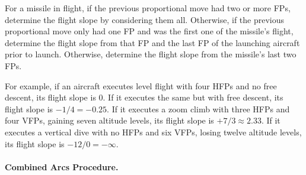 {For a missile in flight, if the previous proportional move had two or more FPs, determine the flight slope by considering them all. Otherwise, if the previous proportional move only had one FP and was the first one of the missile’s flight, determine the flight slope from that FP and the last FP of the launching aircraft prior to launch. Otherwise, determine the flight slope from the missile’s last two FPs.

For example, if an aircraft executes level flight with four HFPs and no free descent, its flight slope is 0. If it executes the same but with free descent, its flight slope is $-1/4 = -0.25$. If it executes a zoom climb with three HFPs and four VFPs, gaining seven altitude levels, its flight slope is $+7/3 \approx 2.33$. If it executes a vertical dive with no HFPs and six VFPs, losing twelve altitude levels, its flight slope is $-12/0 = -\infty$.

\paragraph{Combined Arcs Procedure.}



}
